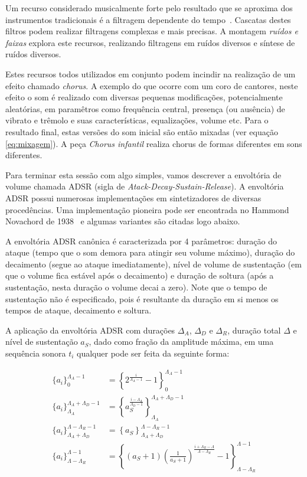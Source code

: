 Um recurso considerado musicalmente forte pelo resultado que se aproxima dos instrumentos tradicionais é a filtragem dependente do tempo~\cite{Roederer}. Cascatas
destes filtros podem realizar filtragens complexas e mais precisas. A montagem \emph{ruídos e faixas} explora
este recursos, realizando filtragens em ruídos diversos e síntese de ruídos diversos.

Estes recursos todos utilizados em conjunto podem incindir na realização de um efeito chamado \emph{chorus}. A
exemplo do que ocorre com um coro de cantores, neste efeito o som é realizado com diversas pequenas modificações,
potencialmente aleatórias, em paramêtros como frequência central, presença (ou ausência) de vibrato
e trêmolo e suas características, equalizações, volume etc. Para o resultado final, estas versões do som
inicial são então mixadas (ver equação \ref{eq:mixagem}). A peça \emph{Chorus infantil} realiza chorus de formas
diferentes em sons diferentes.

Para terminar esta sessão com algo simples, vamos descrever a envoltória de volume chamada ADSR (sigla de \emph{Atack-Decay-Sustain-Release}). A envoltória ADSR possui numerosas implementações em sintetizadores de diversas procedências. Uma implementação pioneira pode ser encontrada no Hammond Novachord de 1938~\cite{ADSR} e algumas variantes são citadas logo abaixo.

A envoltória ADSR canônica é caracterizada por 4 parâmetros: duração do ataque (tempo que o som demora para atingir seu volume máximo), duração do decaimento (segue ao ataque imediatamente), nível de volume de sustentação (em que o volume fica estável após o decaimento) e duração de soltura (após a sustentação, nesta duração o volume decai a zero).
Note que o tempo de sustentação não é especificado, pois é resultante da duração em si menos os tempos de ataque, decaimento e soltura.

A aplicação da envoltória ADSR com durações $\Delta_A$, $\Delta_D$ e $\Delta_R$, duração total $\Delta$ e nível de sustentação $a_S$, dado
como fração da amplitude máxima, em uma sequência sonora $t_i$ qualquer pode ser feita da seguinte forma:

\begin{equation}
\begin{split}
\{a_i\}_0^{\Lambda_A-1} & = \left\{2^{\frac{i}{\Lambda_A-1}}-1\right\}_0^{\Lambda_A-1} \\
\{a_i\}_{\Lambda_A}^{\Lambda_A+\Lambda_D-1} & =\left\{a_S^{\frac{i-\Lambda_A}{\Lambda_D-1}}  \right\}_{\Lambda_A}^{\Lambda_A+\Lambda_D-1} \\
\{ a_i \}_{\Lambda_A+\Lambda_D}^{\Lambda-\Lambda_R-1} & =\left\{ a_S \right\}_{\Lambda_A+\Lambda_D}^{\Lambda-\Lambda_R-1} \\
\{ a_i \}_{\Lambda-\Lambda_R}^{\Lambda-1} & =\left\{ (a_S+1)\left(\frac{1}{a_S+1} \right)^{\frac{i+\Lambda_R-\Lambda}{\Lambda-\Lambda_R}} -1 \right\}_{\Lambda-\Lambda_R}^{\Lambda-1}
\end{split}
\end{equation}


